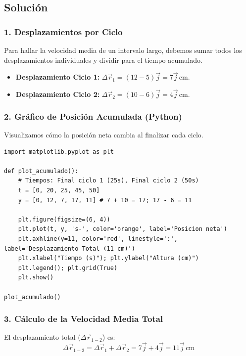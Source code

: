 \documentclass[12pt, a4paper]{article}
\begin{document}
\subsection*{Solución}

\subsubsection*{1. Desplazamientos por Ciclo}
Para hallar la velocidad media de un intervalo largo, debemos sumar todos los desplazamientos individuales y dividir para el tiempo acumulado.

\begin{itemize}
    \item \textbf{Desplazamiento Ciclo 1:} $\Delta \vec{r}_1 = (12 - 5)\vec{j} = 7\vec{j} \, \si{\centi\metre}$.
    \item \textbf{Desplazamiento Ciclo 2:} $\Delta \vec{r}_2 = (10 - 6)\vec{j} = 4\vec{j} \, \si{\centi\metre}$.
\end{itemize}

\subsubsection*{2. Gráfico de Posición Acumulada (Python)}
Visualizamos cómo la posición neta cambia al finalizar cada ciclo.

\begin{lstlisting}
import matplotlib.pyplot as plt

def plot_acumulado():
    # Tiempos: Final ciclo 1 (25s), Final ciclo 2 (50s)
    t = [0, 20, 25, 45, 50]
    y = [0, 12, 7, 17, 11] # 7 + 10 = 17; 17 - 6 = 11
    
    plt.figure(figsize=(6, 4))
    plt.plot(t, y, 's-', color='orange', label='Posicion neta')
    plt.axhline(y=11, color='red', linestyle=':', label='Desplazamiento Total (11 cm)')
    plt.xlabel("Tiempo (s)"); plt.ylabel("Altura (cm)")
    plt.legend(); plt.grid(True)
    plt.show()

plot_acumulado()
\end{lstlisting}

\subsubsection*{3. Cálculo de la Velocidad Media Total}
El desplazamiento total ($\Delta \vec{r}_{1-2}$) es:
\begin{equation}
    \Delta \vec{r}_{1-2} = \Delta \vec{r}_1 + \Delta \vec{r}_2 = 7\vec{j} + 4\vec{j} = 11\vec{j} \, \si{\centi\metre}
\end{equation}
\end{document}

